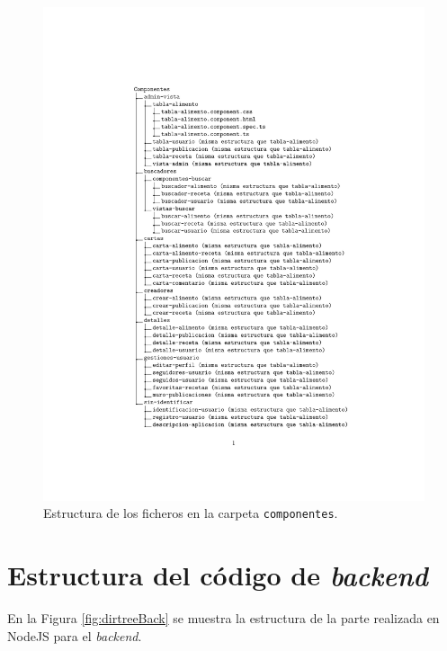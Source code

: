 \begin{figure}
    \centering
    \includegraphics{img/dirtreeComponentes.pdf}
    \caption{Estructura de los ficheros en la carpeta \texttt{componentes}.}
    \label{fig:dirtreeComponentes}
\end{figure}






 

\section{Estructura del código de \textit{backend}}

En la Figura \ref{fig:dirtreeBack} se muestra la estructura de la parte realizada en NodeJS para el \textit{backend}.


